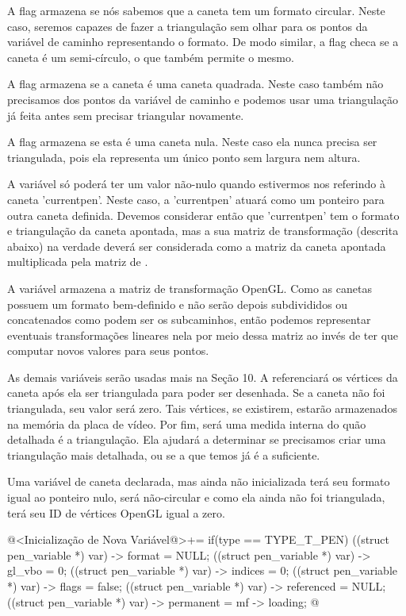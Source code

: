 A flag  armazena se nós sabemos que a
caneta tem um formato circular. Neste caso, seremos capazes de fazer a
triangulação sem olhar para os pontos da variável de caminho
representando o formato. De modo similar, a
flag  checa se a caneta é um
semi-círculo, o que também permite o mesmo.

A flag  armazena se a caneta é uma caneta
quadrada. Neste caso também não precisamos dos pontos da variável de
caminho e podemos usar uma triangulação já feita antes sem precisar
triangular novamente.

A flag  armazena se esta é uma caneta
nula. Neste caso ela nunca precisa ser triangulada, pois ela
representa um único ponto sem largura nem altura.

A variável  só poderá ter um valor não-nulo
quando estivermos nos referindo à caneta 'currentpen'. Neste caso, a
'currentpen' atuará como um ponteiro para outra caneta
definida. Devemos considerar então que 'currentpen' tem o formato e
triangulação da caneta apontada, mas a sua matriz de transformação
(descrita abaixo) na verdade deverá ser considerada como a matriz da
caneta apontada multiplicada pela matriz de .

A variável  armazena a matriz de transformação
OpenGL. Como as canetas possuem um formato bem-definido e não serão
depois subdivididos ou concatenados como podem ser os subcaminhos,
então podemos representar eventuais transformações lineares nela por
meio dessa matriz ao invés de ter que computar novos valores para seus
pontos.

As demais variáveis serão usadas mais na Seção
10. A  referenciará os vértices da caneta após ela
ser triangulada para poder ser desenhada. Se a caneta não foi
triangulada, seu valor será zero. Tais vértices, se existirem, estarão
armazenados na memória da placa de vídeo. Por
fim,  será uma medida interna do quão
detalhada é a triangulação. Ela ajudará a determinar se precisamos
criar uma triangulação mais detalhada, ou se a que temos já é a
suficiente.

Uma variável de caneta declarada, mas ainda não inicializada terá seu
formato igual ao ponteiro nulo, será não-circular e como ela ainda não
foi triangulada, terá seu ID de vértices OpenGL igual a zero.

\iniciocodigo
@<Inicialização de Nova Variável@>+=
if(type == TYPE_T_PEN){
  ((struct pen_variable *) var) -> format = NULL;
  ((struct pen_variable *) var) -> gl_vbo = 0;
  ((struct pen_variable *) var) -> indices = 0;
  ((struct pen_variable *) var) -> flags = false;
  ((struct pen_variable *) var) -> referenced = NULL;
  ((struct pen_variable *) var) -> permanent = mf -> loading;
}
@
\fimcodigo

